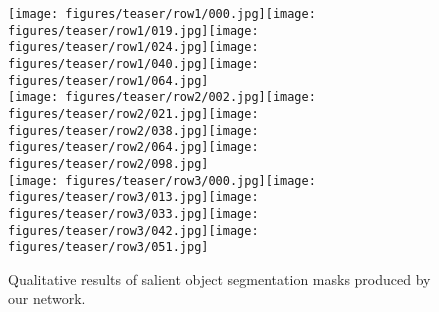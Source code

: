 \documentclass{bmvc2k}
\begin{document}
\begin{figure}[t]
\centering
  \texttt{[image: figures/teaser/row1/000.jpg]}\hspace{1px}\texttt{[image: figures/teaser/row1/019.jpg]}\hspace{1px}\texttt{[image: figures/teaser/row1/024.jpg]}\hspace{1px}\texttt{[image: figures/teaser/row1/040.jpg]}\hspace{1px}\texttt{[image: figures/teaser/row1/064.jpg]}\\
  \texttt{[image: figures/teaser/row2/002.jpg]}\hspace{1px}\texttt{[image: figures/teaser/row2/021.jpg]}\hspace{1px}\texttt{[image: figures/teaser/row2/038.jpg]}\hspace{1px}\texttt{[image: figures/teaser/row2/064.jpg]}\hspace{1px}\texttt{[image: figures/teaser/row2/098.jpg]}\\
  \texttt{[image: figures/teaser/row3/000.jpg]}\hspace{1px}\texttt{[image: figures/teaser/row3/013.jpg]}\hspace{1px}\texttt{[image: figures/teaser/row3/033.jpg]}\hspace{1px}\texttt{[image: figures/teaser/row3/042.jpg]}\hspace{1px}\texttt{[image: figures/teaser/row3/051.jpg]}\\
  
\raggedleft
{}
\vspace{-2px}
  \caption{Qualitative results of salient object segmentation masks produced by our network.}
  \label{fig:teaser}
\end{figure}
\end{document}
